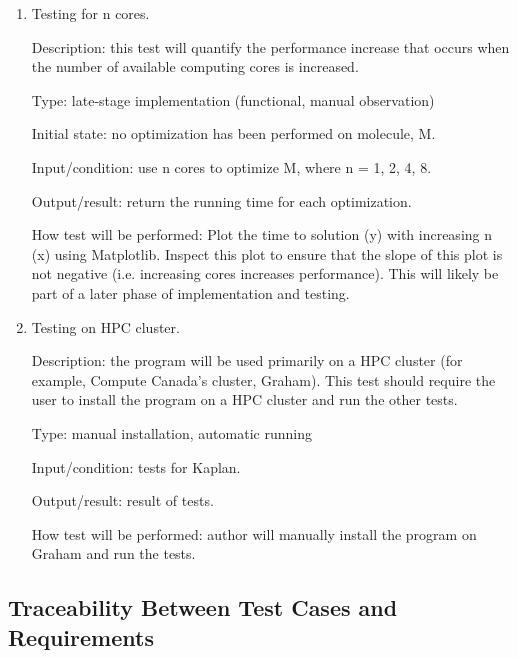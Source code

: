 \documentclass[12pt, titlepage]{article}
\newcommand{\progname}{Kaplan} %
\begin{document}
\begin{enumerate}
	\item Testing for n cores.
	
	Description: this test will quantify the performance increase that occurs 
	when the number of available computing cores is increased.
	
	Type: late-stage implementation (functional, manual observation)
	
	Initial state: no optimization has been performed on molecule, M.
	
	Input/condition: use n cores to optimize M, where n = 1, 2, 4, 8.
	
	Output/result: return the running time for each optimization. 
	
	How test will be performed: Plot the time to solution (y) with increasing n 
	(x) using Matplotlib. Inspect this plot to ensure that the slope of this 
	plot is not negative (i.e. increasing cores increases performance). This 
	will likely be part of a later phase of implementation and testing.
	
	\item Testing on HPC cluster.
	
	Description: the program will be used primarily on a HPC cluster (for 
	example, Compute Canada's cluster, Graham). This test should require the 
	user to install the program on a HPC cluster and run the other tests.
	
	Type: manual installation, automatic running
	
	Input/condition: tests for \progname{}.
	
	Output/result: result of tests.
	
	How test will be performed: author will manually install the program on 
	Graham and run the tests. 
	
	
\end{enumerate}

\subsection{Traceability Between Test Cases and 
Requirements}\label{section-tables}

\end{document}
